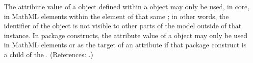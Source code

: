 The  attribute value of a \LocalParameter object defined within a
\KineticLaw object may only be used, in core, in MathML  elements within
the  element of that same \KineticLaw; in other words, the
identifier of the \LocalParameter object is not visible to other parts of
the model outside of that \Reaction instance.  In package constructs, the  attribute value of a \LocalParameter object may only be used in MathML  elements or as the target of an  attribute if that package construct is a child of the .  (References: .)
